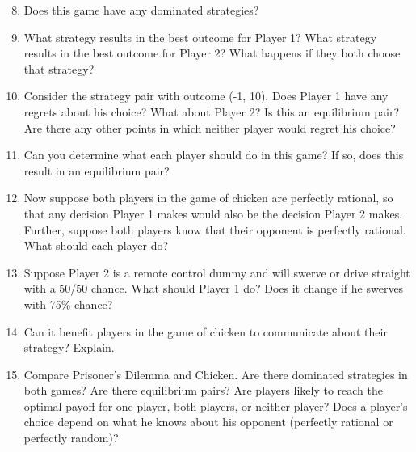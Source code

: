 \begin{enumerate}
\setcounter{enumi}{7}

\item Does this game have any dominated strategies?

\item What strategy results in the best outcome for Player 1? What strategy results in the best outcome for Player 2? What happens if they both choose that strategy?

\item Consider the strategy pair with outcome (-1, 10). Does Player 1 have any regrets about his choice? What about Player 2? Is this an equilibrium pair? Are there any other points in which neither player would regret his choice?

\item Can you determine what each player should do in this game? If so, does this result in an equilibrium pair?

\item Now suppose both players in the game of chicken are perfectly rational, so that any decision Player 1 makes would also be the decision Player 2 makes. Further, suppose both players know that their opponent is perfectly rational. What should each player do?%

\item Suppose Player 2 is a remote control dummy and will swerve or drive straight with a 50/50 chance. What should Player 1 do? Does it change if he swerves with 75\% chance?

\item Can it benefit players in the game of chicken to communicate about their strategy? Explain.


\item Compare Prisoner's Dilemma and Chicken. Are there dominated strategies in both games? Are there equilibrium pairs? Are players likely to reach the optimal payoff for one player, both players, or neither player? Does a player's choice depend on what he knows about his opponent (perfectly rational or perfectly random)?

\end{enumerate}



 
